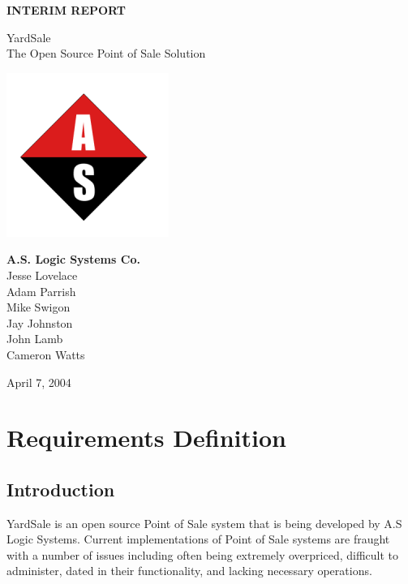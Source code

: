 \documentclass{report}
\begin{document}
\begin{titlepage}
\vspace*{2cm}
\begin{center}

{\LARGE {\bf INTERIM REPORT}}\\
\vspace*{1cm}



\LARGE{ YardSale\\The Open Source Point of Sale Solution\\ }


\includegraphics{aslogic_smaller.png}

\large{{\bf A.S. Logic Systems Co.}\\Jesse Lovelace\\Adam
Parrish\\Mike Swigon\\Jay Johnston\\John Lamb\\Cameron Watts\\}

\vspace*{0.5cm}

{April 7, 2004}
\end{center}
\end{titlepage}

\tableofcontents

\chapter{Requirements Definition}

\section{Introduction}

YardSale is an open source Point of Sale system that is being
developed by A.S Logic Systems.  Current
implementations of Point of Sale systems are fraught with a number
of issues including often being extremely overpriced, difficult
to administer, dated in their functionality, and lacking necessary
operations.
\end{document}
